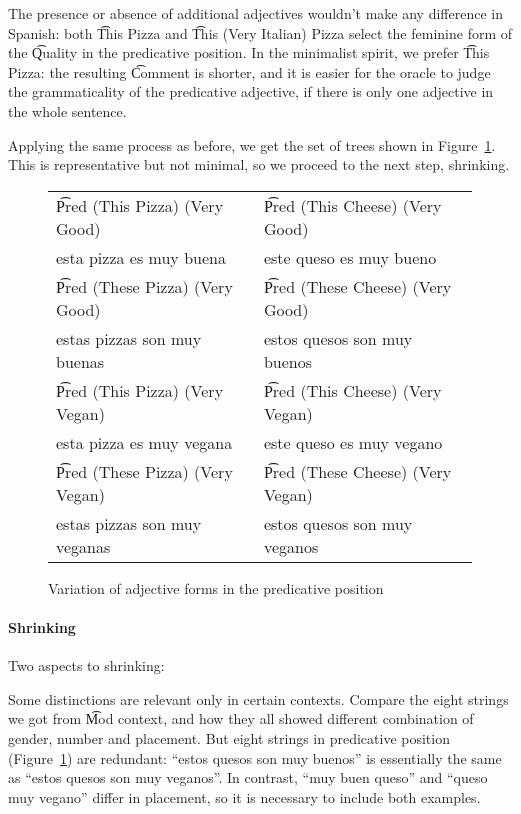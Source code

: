 The presence or absence of additional adjectives wouldn't make any
difference in Spanish: both \t{This Pizza} and \t{This (Very Italian)
 Pizza} select the feminine form of the \t{Quality} in the predicative
position. In the minimalist spirit, we prefer \t{This Pizza}: the
resulting \t{Comment} is shorter, and it is easier for the oracle to
judge the grammaticality of the predicative adjective, if there is
only one adjective in the whole sentence. 

Applying the same process as before, we get the set of trees shown in 
Figure~\ref{fig:goodCheese}. This is representative but not minimal,
so we proceed to the next step, shrinking.

\begin{figure}
\centering
\begin{tabular}{| l | l |}
\hline
\t{Pred (This Pizza) (Very Good)}   & \t{Pred (This Cheese) (Very Good)} \\ 
esta pizza es muy buena             & este queso es muy bueno \\ \hline
\t{Pred (These Pizza) (Very Good)}  & \t{Pred (These Cheese) (Very Good)} \\ 
estas pizzas son muy buenas         & estos quesos son muy buenos \\ \hline
\t{Pred (This Pizza) (Very Vegan)}   & \t{Pred (This Cheese) (Very Vegan)} \\ 
esta pizza es muy vegana             & este queso es muy vegano \\ \hline
\t{Pred (These Pizza) (Very Vegan)}  & \t{Pred (These Cheese) (Very Vegan)} \\ 
estas pizzas son muy veganas         & estos quesos son muy veganos \\ \hline
\end{tabular}
\caption{Variation of adjective forms in the predicative position}
\label{fig:goodCheese}
\end{figure}


\paragraph{Shrinking}

Two aspects to shrinking:

Some distinctions are relevant only in certain
contexts. Compare the eight strings we got from \t{Mod} context, and
how they all showed different combination of gender, number and
placement. But eight strings in predicative position (Figure~\ref{fig:goodCheese})
are redundant: ``estos quesos son muy buenos'' is essentially the same
as ``estos quesos son muy veganos''. In contrast, ``muy buen queso''
and ``queso muy vegano'' differ in placement, so it is necessary to
include both examples.

